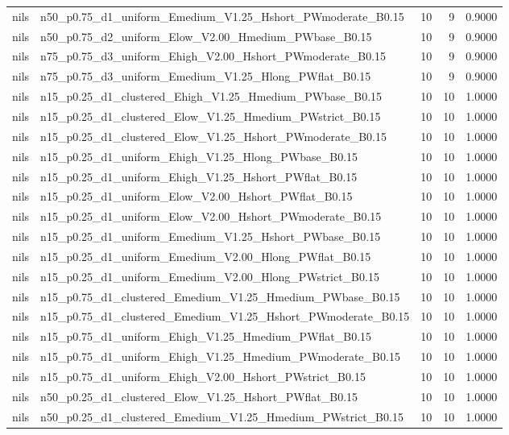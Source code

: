 \begin{tabular}{llrrr}
nils & n50_p0.75_d1_uniform_Emedium_V1.25_Hshort_PWmoderate_B0.15 & 10 & 9 & 0.9000 \\
nils & n50_p0.75_d2_uniform_Elow_V2.00_Hmedium_PWbase_B0.15 & 10 & 9 & 0.9000 \\
nils & n75_p0.75_d3_uniform_Ehigh_V2.00_Hshort_PWmoderate_B0.15 & 10 & 9 & 0.9000 \\
nils & n75_p0.75_d3_uniform_Emedium_V1.25_Hlong_PWflat_B0.15 & 10 & 9 & 0.9000 \\
nils & n15_p0.25_d1_clustered_Ehigh_V1.25_Hmedium_PWbase_B0.15 & 10 & 10 & 1.0000 \\
nils & n15_p0.25_d1_clustered_Elow_V1.25_Hmedium_PWstrict_B0.15 & 10 & 10 & 1.0000 \\
nils & n15_p0.25_d1_clustered_Elow_V1.25_Hshort_PWmoderate_B0.15 & 10 & 10 & 1.0000 \\
nils & n15_p0.25_d1_uniform_Ehigh_V1.25_Hlong_PWbase_B0.15 & 10 & 10 & 1.0000 \\
nils & n15_p0.25_d1_uniform_Ehigh_V1.25_Hshort_PWflat_B0.15 & 10 & 10 & 1.0000 \\
nils & n15_p0.25_d1_uniform_Elow_V2.00_Hshort_PWflat_B0.15 & 10 & 10 & 1.0000 \\
nils & n15_p0.25_d1_uniform_Elow_V2.00_Hshort_PWmoderate_B0.15 & 10 & 10 & 1.0000 \\
nils & n15_p0.25_d1_uniform_Emedium_V1.25_Hshort_PWbase_B0.15 & 10 & 10 & 1.0000 \\
nils & n15_p0.25_d1_uniform_Emedium_V2.00_Hlong_PWflat_B0.15 & 10 & 10 & 1.0000 \\
nils & n15_p0.25_d1_uniform_Emedium_V2.00_Hlong_PWstrict_B0.15 & 10 & 10 & 1.0000 \\
nils & n15_p0.75_d1_clustered_Emedium_V1.25_Hmedium_PWbase_B0.15 & 10 & 10 & 1.0000 \\
nils & n15_p0.75_d1_clustered_Emedium_V1.25_Hshort_PWmoderate_B0.15 & 10 & 10 & 1.0000 \\
nils & n15_p0.75_d1_uniform_Ehigh_V1.25_Hmedium_PWflat_B0.15 & 10 & 10 & 1.0000 \\
nils & n15_p0.75_d1_uniform_Ehigh_V1.25_Hmedium_PWmoderate_B0.15 & 10 & 10 & 1.0000 \\
nils & n15_p0.75_d1_uniform_Ehigh_V2.00_Hshort_PWstrict_B0.15 & 10 & 10 & 1.0000 \\
nils & n50_p0.25_d1_clustered_Elow_V1.25_Hshort_PWflat_B0.15 & 10 & 10 & 1.0000 \\
nils & n50_p0.25_d1_clustered_Emedium_V1.25_Hmedium_PWstrict_B0.15 & 10 & 10 & 1.0000 \\

\end{tabular}
